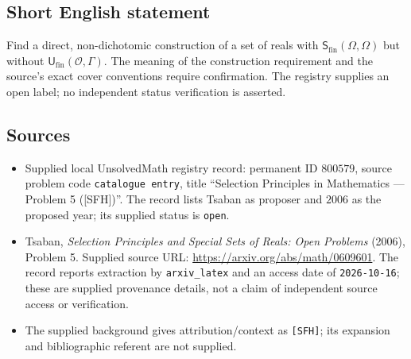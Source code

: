 \documentclass[11pt]{article}
\begin{document}
\subsection{Short English statement}
Find a direct, non-dichotomic construction of a set of reals with \(\mathsf S_{\mathrm{fin}}(\Omega,\Omega)\) but without \(\mathsf U_{\mathrm{fin}}(\mathcal O,\Gamma)\). The meaning of the construction requirement and the source's exact cover conventions require confirmation. The registry supplies an open label; no independent status verification is asserted.
\subsection{Sources}
\begin{itemize}
\item Supplied local UnsolvedMath registry record: permanent ID \(800579\), source problem code \texttt{catalogue entry}, title ``Selection Principles in Mathematics --- Problem 5 ([SFH])''. The record lists Tsaban as proposer and \(2006\) as the proposed year; its supplied status is \texttt{open}.
\item Tsaban, \emph{Selection Principles and Special Sets of Reals: Open Problems} (2006), Problem 5. Supplied source URL: \url{https://arxiv.org/abs/math/0609601}. The record reports extraction by \texttt{arxiv\_latex} and an access date of \texttt{2026-10-16}; these are supplied provenance details, not a claim of independent source access or verification.
\item The supplied background gives attribution/context as \texttt{[SFH]}; its expansion and bibliographic referent are not supplied.
\end{itemize}
\end{document}
